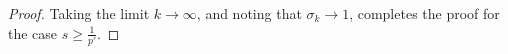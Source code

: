 \documentclass[]{amsart}
\theoremstyle{definition}
\theoremstyle{definition}
\theoremstyle{remark}
\numberwithin{equation}{section}
\newcommand{\grads}{\nabla^{s}}
\begin{document}
\begin{proof}
	Taking the limit \(k \to \infty\), and noting that \(\sigma_k \to 1\), completes the proof for the case \(s \geq \frac{1}{p'}\).
	
		

\end{proof}
\end{document}
